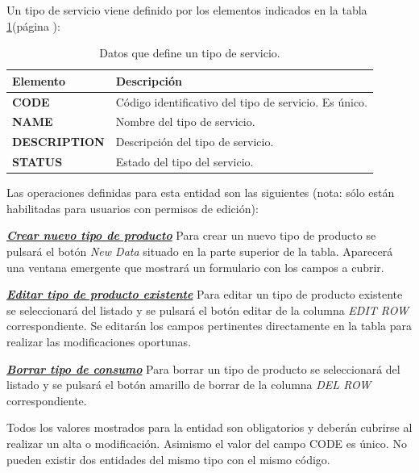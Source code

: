 Un tipo de servicio viene definido por los elementos indicados en la tabla \ref{tab:tipo-servicio}(página \pageref{tab:tipo-servicio}):



\begin{table}[H]
  \centering
  \setlength{\leftmargini}{0.4cm}
  \resizebox{14cm}{!} {
  \begin{tabular}{|m{3cm} m{11cm}|}
  \rowcolor{udcpink!25}
  \hline
  	\textbf{Elemento} & \textbf{Descripción} \\\hline
	\textbf{CODE} & Código identificativo del tipo de servicio. Es único.   \\
	\textbf{NAME} & Nombre del tipo de servicio. \\
	\textbf{DESCRIPTION} & Descripción del tipo de servicio. \\		
	\textbf{STATUS} & Estado del tipo del servicio.
	\\\hline
  \end{tabular}
  } %
  \caption{Datos que define un tipo de servicio.}
  \label{tab:tipo-servicio}
\end{table}

Las operaciones definidas para esta entidad son las siguientes (nota: sólo están habilitadas para usuarios con permisos de edición):

\underline{\textsl{\textbf{Crear nuevo tipo de producto}}}\newline
Para crear un nuevo tipo de producto se pulsará el botón \textit{New Data} situado en la parte superior de la tabla. Aparecerá una ventana emergente que mostrará un formulario con los campos a cubrir.

\underline{\textsl{\textbf{Editar tipo de producto existente}}}\newline
Para editar un tipo de producto existente se seleccionará del listado y se pulsará el botón editar de la columna \textit{EDIT ROW} correspondiente. Se editarán los campos pertinentes directamente en la tabla para realizar las modificaciones oportunas. 

\underline{\textsl{\textbf{Borrar tipo de consumo}}}\newline
Para borrar un tipo de producto se seleccionará del listado y se pulsará el botón amarillo de borrar de la columna \textit{DEL ROW} correspondiente.\newline

Todos los valores mostrados para la entidad son obligatorios y deberán cubrirse al realizar un alta o modificación. Asimismo el valor del campo CODE es único. No pueden existir dos entidades del mismo tipo con el mismo código.



